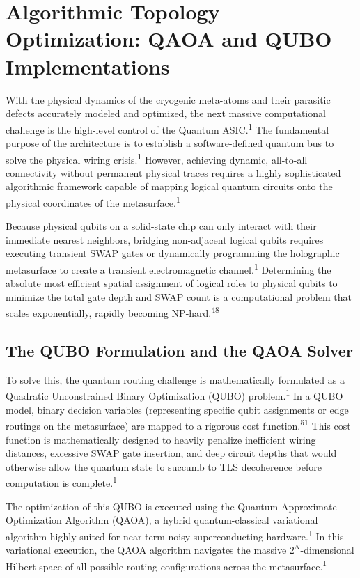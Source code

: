 \documentclass[11pt, a4paper]{article}
\begin{document}
\section{Algorithmic Topology Optimization: QAOA and QUBO Implementations}

With the physical dynamics of the cryogenic meta-atoms and their parasitic defects accurately modeled and optimized, the next massive computational challenge is the high-level control of the Quantum ASIC.\textsuperscript{1} The fundamental purpose of the architecture is to establish a software-defined quantum bus to solve the physical wiring crisis.\textsuperscript{1} However, achieving dynamic, all-to-all connectivity without permanent physical traces requires a highly sophisticated algorithmic framework capable of mapping logical quantum circuits onto the physical coordinates of the metasurface.\textsuperscript{1}

Because physical qubits on a solid-state chip can only interact with their immediate nearest neighbors, bridging non-adjacent logical qubits requires executing transient SWAP gates or dynamically programming the holographic metasurface to create a transient electromagnetic channel.\textsuperscript{1} Determining the absolute most efficient spatial assignment of logical roles to physical qubits to minimize the total gate depth and SWAP count is a computational problem that scales exponentially, rapidly becoming NP-hard.\textsuperscript{48}

\subsection{The QUBO Formulation and the QAOA Solver}

To solve this, the quantum routing challenge is mathematically formulated as a Quadratic Unconstrained Binary Optimization (QUBO) problem.\textsuperscript{1} In a QUBO model, binary decision variables (representing specific qubit assignments or edge routings on the metasurface) are mapped to a rigorous cost function.\textsuperscript{51} This cost function is mathematically designed to heavily penalize inefficient wiring distances, excessive SWAP gate insertion, and deep circuit depths that would otherwise allow the quantum state to succumb to TLS decoherence before computation is complete.\textsuperscript{1}

The optimization of this QUBO is executed using the Quantum Approximate Optimization Algorithm (QAOA), a hybrid quantum-classical variational algorithm highly suited for near-term noisy superconducting hardware.\textsuperscript{1} In this variational execution, the QAOA algorithm navigates the massive $2^N$-dimensional Hilbert space of all possible routing configurations across the metasurface.\textsuperscript{1}
\end{document}
